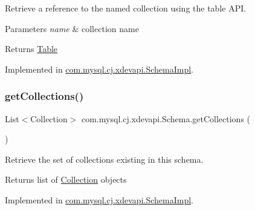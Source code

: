 Retrieve a reference to the named collection using the table A\+PI.


\begin{DoxyParams}{Parameters}
{\em name} & collection name \\
\hline
\end{DoxyParams}
\begin{DoxyReturn}{Returns}
\mbox{\hyperlink{interfacecom_1_1mysql_1_1cj_1_1xdevapi_1_1_table}{Table}} 
\end{DoxyReturn}


Implemented in \mbox{\hyperlink{classcom_1_1mysql_1_1cj_1_1xdevapi_1_1_schema_impl_a8382999acc577f81226c60bfa015a8a9}{com.\+mysql.\+cj.\+xdevapi.\+Schema\+Impl}}.

\mbox{\label{interfacecom_1_1mysql_1_1cj_1_1xdevapi_1_1_schema_a644344cb0eaa8ea239f7b82443c487ec}} 
\subsubsection{\texorpdfstring{get\+Collections()}{getCollections()}\hspace{0.1cm}{\footnotesize\ttfamily [1/2]}}
{\footnotesize\ttfamily List$<$Collection$>$ com.\+mysql.\+cj.\+xdevapi.\+Schema.\+get\+Collections (\begin{DoxyParamCaption}{ }\end{DoxyParamCaption})}

Retrieve the set of collections existing in this schema.

\begin{DoxyReturn}{Returns}
list of \mbox{\hyperlink{interfacecom_1_1mysql_1_1cj_1_1xdevapi_1_1_collection}{Collection}} objects 
\end{DoxyReturn}


Implemented in \mbox{\hyperlink{classcom_1_1mysql_1_1cj_1_1xdevapi_1_1_schema_impl_a67c63b711c361bf306149d53d1149e61}{com.\+mysql.\+cj.\+xdevapi.\+Schema\+Impl}}.

\mbox{\label{interfacecom_1_1mysql_1_1cj_1_1xdevapi_1_1_schema_ac569085a3e372ef1db5f65f3a9e644ce}} 
